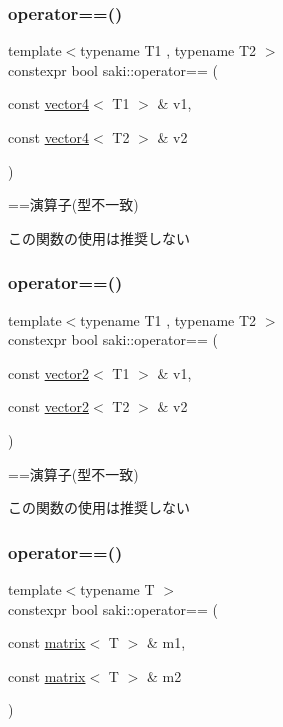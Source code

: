 \subsubsection{\texorpdfstring{operator==()}{operator==()}\hspace{0.1cm}{\footnotesize\ttfamily [8/11]}}
{\footnotesize\ttfamily template$<$typename T1 , typename T2 $>$ \\
constexpr bool saki\+::operator== (\begin{DoxyParamCaption}\item[{const \mbox{\hyperlink{classsaki_1_1vector4}{vector4}}$<$ T1 $>$ \&}]{v1,  }\item[{const \mbox{\hyperlink{classsaki_1_1vector4}{vector4}}$<$ T2 $>$ \&}]{v2 }\end{DoxyParamCaption})}



==演算子(型不一致) 

この関数の使用は推奨しない \mbox{\label{namespacesaki_a07efea0cf7385fc13c00519e8f0f7732}} 
\subsubsection{\texorpdfstring{operator==()}{operator==()}\hspace{0.1cm}{\footnotesize\ttfamily [9/11]}}
{\footnotesize\ttfamily template$<$typename T1 , typename T2 $>$ \\
constexpr bool saki\+::operator== (\begin{DoxyParamCaption}\item[{const \mbox{\hyperlink{classsaki_1_1vector2}{vector2}}$<$ T1 $>$ \&}]{v1,  }\item[{const \mbox{\hyperlink{classsaki_1_1vector2}{vector2}}$<$ T2 $>$ \&}]{v2 }\end{DoxyParamCaption})}



==演算子(型不一致) 

この関数の使用は推奨しない \mbox{\label{namespacesaki_a67e5e15cae6e9152e0bd5ac2e1705da4}} 
\subsubsection{\texorpdfstring{operator==()}{operator==()}\hspace{0.1cm}{\footnotesize\ttfamily [10/11]}}
{\footnotesize\ttfamily template$<$typename T $>$ \\
constexpr bool saki\+::operator== (\begin{DoxyParamCaption}\item[{const \mbox{\hyperlink{classsaki_1_1matrix}{matrix}}$<$ T $>$ \&}]{m1,  }\item[{const \mbox{\hyperlink{classsaki_1_1matrix}{matrix}}$<$ T $>$ \&}]{m2 }\end{DoxyParamCaption})}



